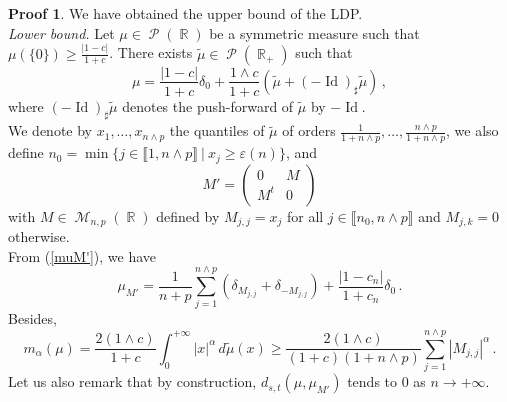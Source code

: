 \documentclass[11pt,a4paper]{article}
\DeclareMathOperator{\R}{\mathbb{R}}
\DeclareMathOperator{\MM}{\mathcal{M}}
\DeclareMathOperator{\PP}{\mathcal{P}}
\DeclareMathOperator{\1}{\mathbf{1}}
\DeclareMathOperator{\Id}{\mathrm{Id}}
\theoremstyle{definition}
\newtheorem*{Proof}{Proof}
\begin{document}
\begin{Proof}
We have obtained the upper bound of the LDP.\\

\emph{Lower bound.} Let $\mu \in \PP(\R)$ be a symmetric measure such that $\mu(\{0\}) \ge \frac{|1-c|}{1+c}$. There exists $\tilde{\mu} \in \PP(\R_+)$ such that
\begin{displaymath}
\mu = \frac{|1-c|}{1+c} \delta_0 + \frac{1 \wedge c}{1+c} (\tilde{\mu} + (-\Id)_{\sharp}\tilde{\mu}) \, ,
\end{displaymath}
where $(-\Id)_{\sharp}\tilde{\mu}$ denotes the push-forward of $\tilde{\mu}$ by $-\Id$.\\
We denote by $x_1,\ldots,x_{n \wedge p}$ the quantiles of $\tilde{\mu}$ of orders $\frac{1}{1+n \wedge p}, \ldots, \frac{n \wedge p}{1+n \wedge p}$, we also define $n_0 = \min \{ j \in \llbracket 1,n \wedge p \rrbracket \ | \ x_j \ge \varepsilon(n) \}$, and
\begin{displaymath}
M' = \left( \begin{array}{c|c} 0 & M \\ \hline M^t & 0 \end{array} \right)
\end{displaymath}
with $M \in \MM_{n,p}(\R)$ defined by $M_{j,j} = x_j$ for all $j \in \llbracket n_0, n \wedge p \rrbracket$ and $M_{j,k}=0$ otherwise.\\
From (\ref{muM'}), we have
\begin{displaymath}
\mu_{M'} = \frac{1}{n+p} \sum_{j=1}^{n \wedge p} \left( \delta_{M_{j,j}} + \delta_{-M_{j,j}} \right) + \frac{|1-c_n|}{1+c_n} \delta_0 \, .
\end{displaymath}
Besides,
\begin{equation} \label{LDP_C'_eq3}
m_{\alpha}(\mu) = \frac{2(1 \wedge c)}{1+c} \int_0^{+\infty} |x|^{\alpha} \, d\tilde{\mu}(x) \ge \frac{2(1 \wedge c)}{(1+c)(1+n \wedge p)} \sum_{j=1}^{n \wedge p} |M_{j,j}|^{\alpha} \, .
\end{equation}
Let us also remark that by construction, $d_{s,t}(\mu,\mu_{M'})$ tends to 0 as $n \to +\infty$.\\


\end{Proof}
\end{document}
